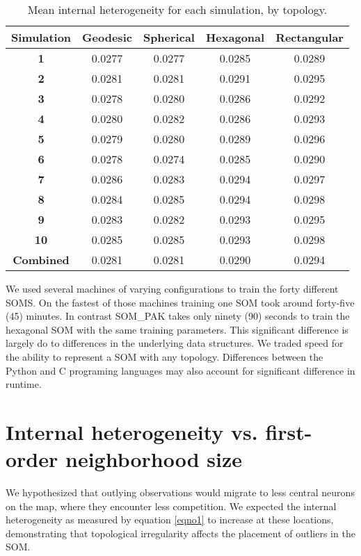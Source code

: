 \begin{table}[hbt]
\centering
\caption{Mean internal heterogeneity for each simulation, by topology.}
\label{ivtable3}
\begin{tabular}{|c||c|c|c|c|}
\hline
\textbf{Simulation} & Geodesic & Spherical & Hexagonal & Rectangular \\
\hline
\hline
\textbf{1} & 0.0277 & 0.0277 & 0.0285 & 0.0289 \\
\textbf{2} & 0.0281 & 0.0281 & 0.0291 & 0.0295 \\
\textbf{3} & 0.0278 & 0.0280 & 0.0286 & 0.0292 \\
\textbf{4} & 0.0280 & 0.0282 & 0.0286 & 0.0293 \\
\textbf{5} & 0.0279 & 0.0280 & 0.0289 & 0.0296 \\
\textbf{6} & 0.0278 & 0.0274 & 0.0285 & 0.0290 \\
\textbf{7} & 0.0286 & 0.0283 & 0.0294 & 0.0297 \\
\textbf{8} & 0.0284 & 0.0285 & 0.0294 & 0.0298 \\
\textbf{9} & 0.0283 & 0.0282 & 0.0293 & 0.0295 \\
\textbf{10}& 0.0285 & 0.0285 & 0.0293 & 0.0298 \\
\hline
\hline
\textbf{Combined} & 0.0281 & 0.0281 & 0.0290 & 0.0294\\
\hline
\end{tabular} \end{table}

We used several machines of varying configurations to train the forty
different SOMS.  On the fastest of those machines training one SOM took
around forty-five (45) minutes.  In contrast SOM\_PAK takes only ninety (90)
seconds to train the hexagonal SOM with the same training parameters.  This
significant difference is largely do to differences in the underlying data
structures.  We traded speed for the ability to represent a SOM with any
topology.  Differences between the Python and C programing languages may also
account for significant difference in runtime.


\section{Internal heterogeneity vs. first-order neighborhood size}
\label{rdq1}
We hypothesized that outlying observations would migrate to less central neurons on the map, where
they encounter less competition.  We expected the internal heterogeneity
as measured by equation \ref{eqno1} to increase at these locations,
demonstrating that topological irregularity affects the placement of outliers
in the SOM.  

